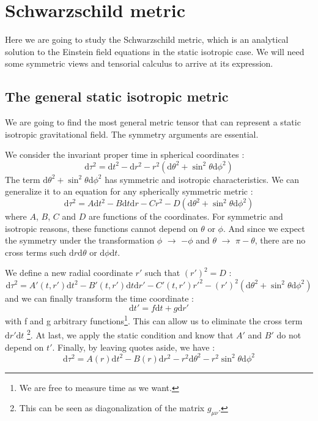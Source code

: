 \section{Schwarzschild metric}

Here we are going to study the Schwarzschild metric, which is an analytical solution to
the Einstein field equations in the static isotropic case. We will need some symmetric views and
tensorial calculus to arrive at its expression.

\subsection{The general static isotropic metric}

We are going to find the most general metric tensor that can represent a static isotropic
gravitational field. The symmetry arguments are essential. 

We consider the invariant proper time in spherical coordinates :
%
\begin{equation}\label{minkowski_spherical}
	\mathrm{d}\tau^2 = \mathrm{d}t^2-\mathrm{d}r^2-r^2(\mathrm{d}\theta ^2+\sin^2\theta
	\mathrm{d}\phi^2)
\end{equation}
%
The term $\mathrm{d}\theta ^2+\sin^2\theta \mathrm{d}\phi^2$ has symmetric and isotropic
characteristics.
We can generalize it to an equation for any spherically symmetric metric :
%
\begin{equation}
	\mathrm{d}\tau^2=A\mathrm{d}t^2-B\mathrm{d}t\mathrm{d}r-Cr^2-D(\mathrm{d}\theta ^2
	+\sin^2\theta \mathrm{d}\phi^2)
\end{equation}
%
where $A$, $B$, $C$ and $D$ are functions of the coordinates.
For symmetric and isotropic reasons, these functions cannot depend on $\theta$
or $\phi$. And since we expect the symmetry under the transformation $\phi$ $\rightarrow$
$-\phi$ and $\theta$ $\rightarrow$ $\pi-\theta$, there are no cross terms such
$\mathrm{d}r\mathrm{d}\theta$ or $\mathrm{d}\phi \mathrm{d}t$.

We define a new radial coordinate $r'$ such that $\left(r'\right)^2=D$ :
%
\begin{equation}
	\mathrm{d}\tau^2=A'(t,r')\mathrm{d}t^2-B'(t,r')\mathrm{d}t\mathrm{d}r'-C'(t,r')r'^2-\left(r'\right)^2
	\left(\mathrm{d}\theta ^2+\sin^2\theta \mathrm{d}\phi^2\right)
\end{equation}
%
and we can finally transform the time coordinate :
%
\begin{equation}
	\mathrm{d}t'=f\mathrm{d}t+g\mathrm{d}r'
\end{equation}
%
with f and g arbitrary functions\footnote{We are free to measure time as we want.}. This can allow us to eliminate the cross term
$\mathrm{d}r'\mathrm{d}t$ \footnote{This can be seen as diagonalization of the matrix $g_{\mu\nu}$.}.
At last, we apply the static condition and know that $A'$ and $B'$ do not depend on $t'$.
Finally, by leaving quotes aside, we have :
\begin{equation}\label{symmetry}
	\mathrm{d}\tau^2=A\left(r\right)\mathrm{d}t^2-B\left(r\right)
	\mathrm{d}r^2-r^2\mathrm{d}\theta ^2-r^2\sin^2\theta \mathrm{d}\phi^2
\end{equation}

